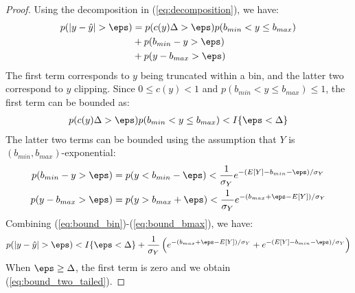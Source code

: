 \documentclass[]{article}
\begin{document}
\begin{proof}
Using the decomposition in (\ref{eq:decomposition}), we have:
\begin{align} \label{eq:decomp_proba}
    p(|y - \hat{y}| > \eps)
                            &= p(c(y)\Delta > \eps)p(b_{min} < y \le b_{max}) \nonumber \\
                            &+ p(b_{min} - y > \eps) \\
                            &+ p(y - b_{max} > \eps) \nonumber
\end{align}
The first term corresponds to $y$ being truncated within a bin, and the latter two correspond to $y$ clipping. Since $0 \le c(y) < 1$ and $p(b_{min} < y \le b_{max}) \le 1$, the first term can be bounded as:
\begin{align}
    p(c(y)\Delta > \eps)p(b_{min} < y \le b_{max}) < I\{\eps < \Delta\} \label{eq:bound_bin}
\end{align}
The latter two terms can be bounded using the assumption that $Y$ is $(b_{min}, b_{max})$-exponential:
\begin{align}
    p(b_{min} - y > \eps) &= p(y < b_{min} - \eps) < \frac{1}{\sigma_Y} e^{-(E[Y] - b_{min} - \eps) / \sigma_Y} \\
    p(y - b_{max} > \eps) &= p(y > b_{max} + \eps) < \frac{1}{\sigma_Y} e^{-(b_{max} + \eps - E[Y]) / \sigma_Y} \label{eq:bound_bmax}
\end{align}
Combining (\ref{eq:bound_bin})-(\ref{eq:bound_bmax}), we have:
\begin{align}
    p(|y - \hat{y}| > \eps) < I\{\eps < \Delta\} +
                            \frac{1}{\sigma_Y} \left(
                                e^{-(b_{max} + \eps - E[Y]) / \sigma_Y}
                                + e^{-(E[Y] - b_{min} - \eps) / \sigma_Y}
                            \right)
\end{align}
When $\eps \ge \Delta$, the first term is zero and we obtain (\ref{eq:bound_two_tailed}).
\end{proof}
\end{document}
